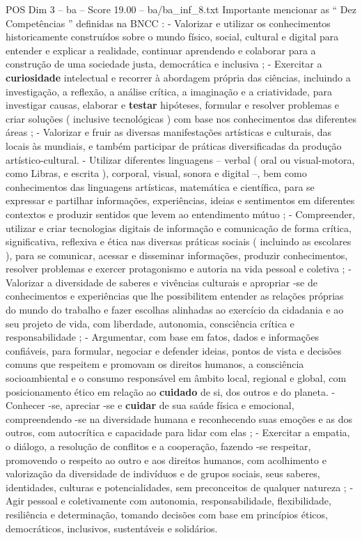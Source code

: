 \begin{textsample}{POS Dim 3 – ba – Score 19.00 – ba/ba\_inf\_8.txt}
Importante mencionar as “ Dez Competências ” definidas na BNCC : - Valorizar e utilizar os conhecimentos historicamente construídos sobre o mundo físico, social, cultural e digital para entender e explicar a realidade, continuar aprendendo e colaborar para a construção de uma sociedade justa, democrática e inclusiva ; - Exercitar a \textbf{curiosidade} intelectual e recorrer à abordagem própria das ciências, incluindo a investigação, a reflexão, a análise crítica, a imaginação e a criatividade, para investigar causas, elaborar e \textbf{testar} hipóteses, formular e resolver problemas e criar soluções ( inclusive tecnológicas ) com base nos conhecimentos das diferentes áreas ; - Valorizar e fruir as diversas manifestações artísticas e culturais, das locais às mundiais, e também participar de práticas diversificadas da produção artístico-cultural. - Utilizar diferentes linguagens – verbal ( oral ou visual-motora, como Libras, e escrita ), corporal, visual, sonora e digital –, bem como conhecimentos das linguagens artísticas, matemática e científica, para se expressar e partilhar informações, experiências, ideias e sentimentos em diferentes contextos e produzir sentidos que levem ao entendimento mútuo ; - Compreender, utilizar e criar tecnologias digitais de informação e comunicação de forma crítica, significativa, reflexiva e ética nas diversas práticas sociais ( incluindo as escolares ), para se comunicar, acessar e disseminar informações, produzir conhecimentos, resolver problemas e exercer protagonismo e autoria na vida pessoal e coletiva ; - Valorizar a diversidade de saberes e vivências culturais e apropriar -se de conhecimentos e experiências que lhe possibilitem entender as relações próprias do mundo do trabalho e fazer escolhas alinhadas ao exercício da cidadania e ao seu projeto de vida, com liberdade, autonomia, consciência crítica e responsabilidade ; - Argumentar, com base em fatos, dados e informações confiáveis, para formular, negociar e defender ideias, pontos de vista e decisões comuns que respeitem e promovam os direitos humanos, a consciência socioambiental e o consumo responsável em âmbito local, regional e global, com posicionamento ético em relação ao \textbf{cuidado} de si, dos outros e do planeta. - Conhecer -se, apreciar -se e \textbf{cuidar} de sua saúde física e emocional, compreendendo -se na diversidade humana e reconhecendo suas emoções e as dos outros, com autocrítica e capacidade para lidar com elas ; - Exercitar a empatia, o diálogo, a resolução de conflitos e a cooperação, fazendo -se respeitar, promovendo o respeito ao outro e aos direitos humanos, com acolhimento e valorização da diversidade de indivíduos e de grupos sociais, seus saberes, identidades, culturas e potencialidades, sem preconceitos de qualquer natureza ; - Agir pessoal e coletivamente com autonomia, responsabilidade, flexibilidade, resiliência e determinação, tomando decisões com base em princípios éticos, democráticos, inclusivos, sustentáveis e solidários.

\end{textsample}
